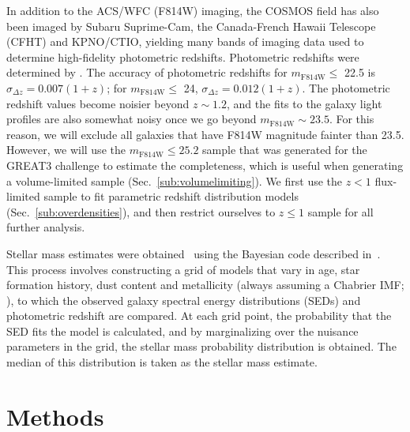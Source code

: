 \documentclass[twocolumn,useAMS,usenatbib]{mn2e}
\newcommand{\rachel}[1]{{\textcolor{red}{#1}}}
\begin{document}
In addition to the ACS/WFC (F814W) imaging, the COSMOS field has also been imaged by Subaru Suprime-Cam, the
Canada-French Hawaii Telescope (CFHT) and KPNO/CTIO, yielding many bands
of imaging data used to determine high-fidelity photometric
redshifts. 
Photometric redshifts were determined by
\cite{COSMOS_Photoz_30band}. The accuracy of photometric redshifts for
$m_\text{F814W}\le$ 22.5 is $\sigma_{\Delta z} = 0.007(1+z)$; for $m_\text{F814W}\le$ 24, $\sigma_{\Delta z} = 0.012(1+z)$.
The photometric redshift values become noisier beyond $z\sim 1.2$, and
the  fits to the galaxy light profiles are also somewhat noisy once we
go beyond $m_\text{F814W}\sim 23.5$.   
For this reason, we will exclude all galaxies that have F814W
magnitude fainter than 23.5. However, we will use the
$m_\text{F814W}\le 25.2$ sample that was generated for the GREAT3
challenge to estimate the completeness, which is useful when
generating a volume-limited sample (Sec.~\ref{sub:volumelimiting}).
We first use the $z<1$ flux-limited sample to fit parametric redshift
distribution models (Sec.~\ref{sub:overdensities}), and then
restrict ourselves to $z\le1$ sample for all further analysis. 

Stellar mass estimates were obtained~\citep{COSMOS_XRAY} using the
Bayesian code described in~\cite{KEVIN_MSTAR}.  This process involves
constructing a grid of models that vary in age, star formation
history, dust content and metallicity (always assuming a Chabrier IMF;
\citealt{ChabrierIMF}), 
 to which the observed galaxy spectral energy distributions (SEDs) and photometric redshift are compared. At each grid point, the probability that the 
SED fits the model is calculated, and by marginalizing over the nuisance parameters in the grid, the stellar mass probability distribution is obtained. The median of this distribution
is taken as the stellar mass estimate. 
  

\section{Methods}
\label{S:methods}
\end{document}
